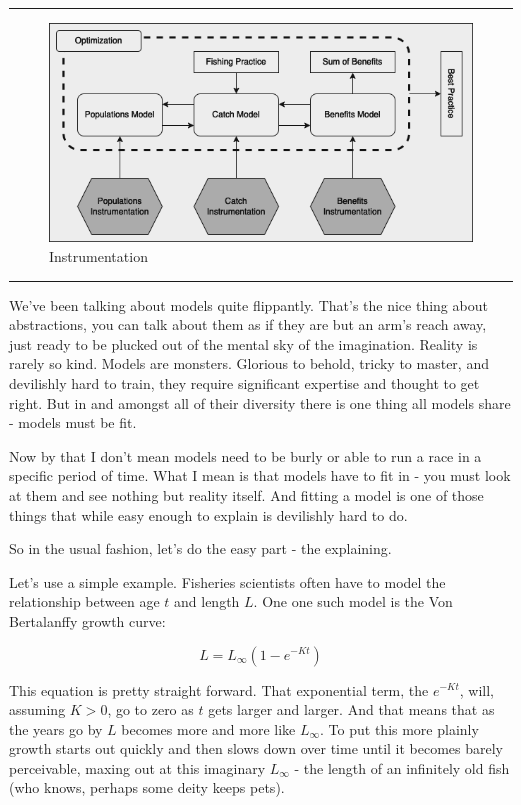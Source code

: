 \documentclass[11pt,a5paper]{book}
\begin{document}
\noindent \rule{\textwidth}{0.5pt} 
\begin{figure}[h!] 
  \includegraphics[width=\linewidth]{drawings/high_level_instrumentation.png}
  \caption{Instrumentation}
  \label{fig:high_level_instrumentation}
\end{figure}
\newline
\rule{\textwidth}{0.5pt} 
\vspace{5pt}

We've been talking about models quite flippantly. That's the nice thing about abstractions, you can talk about them as if they are but an arm's reach away, just ready to be plucked out of the mental sky of the imagination. Reality is rarely so kind. Models are monsters. Glorious to behold, tricky to master, and devilishly hard to train, they require significant expertise and thought to get right. But in and amongst all of their diversity there is one thing all models share - models must be fit.
\newline

Now by that I don't mean models need to be burly or able to run a race in a specific period of time. What I mean is that models have to fit in - you must look at them and see nothing but reality itself. And fitting a model is one of those things that while easy enough to explain is devilishly hard to do. 
\newline

So in the usual fashion, let's do the easy part - the explaining. 
\newline

Let's use a simple example. Fisheries scientists often have to model the relationship between age $t$ and length $L$. One one such model is the Von Bertalanffy growth curve:

$$L = L_{\infty}(1-e^{-Kt})$$

This equation is pretty straight forward. That exponential term, the $e^{-Kt}$, will, assuming $K>0$, go to zero as $t$ gets larger and larger. And that means that as the years go by $L$ becomes more and more like $L_{\infty}$. To put this more plainly growth starts out quickly and then slows down over time until it becomes barely perceivable, maxing out at this imaginary $L_{\infty}$ - the length of an infinitely old fish (who knows, perhaps some deity keeps pets). 
\newline
\end{document}
